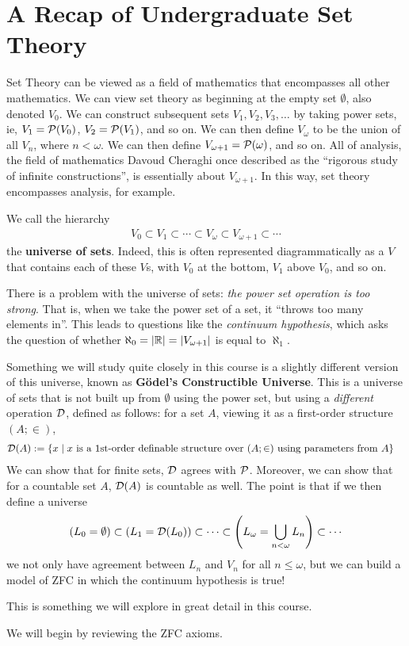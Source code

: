
\chapter{A Recap of Undergraduate Set Theory} \label{Ch1:CH}
\thispagestyle{empty}

Set Theory can be viewed as a field of mathematics that encompasses all other mathematics. We can view set theory as beginning at the empty set $\emptyset$, also denoted $V_0$. We can construct subsequent sets $V_1, V_2, V_3, \ldots$ by taking power sets, ie, $V_1 = \mathcal{P}\!\left( V_0 \right)$, $V_2 = \mathcal{P}\!\left( V_1 \right)$, and so on. We can then define $V_{\omega}$ to be the union of all $V_n$, where $n < \omega$. We can then define $V_{\omega + 1} = \mathcal{P}\!\left( \omega \right)$, and so on. All of analysis, the field of mathematics Davoud Cheraghi once described as the ``rigorous study of infinite constructions'', is essentially about $V_{\omega + 1}$. In this way, set theory encompasses analysis, for example.

We call the hierarchy
\begin{align*}
    V_0 \subset V_1 \subset \cdots \subset V_{\omega} \subset V_{\omega + 1} \subset \cdots
\end{align*}
the \textbf{universe of sets}. Indeed, this is often represented diagrammatically as a $V$ that contains each of these $V$s, with $V_0$ at the bottom, $V_1$ above $V_0$, and so on.

There is a problem with the universe of sets: \textit{the power set operation is too strong}. That is, when we take the power set of a set, it ``throws too many elements in''. This leads to questions like the \textit{continuum hypothesis}, which asks the question of whether $\aleph_0 = \left\lvert \mathbb{R} \right\rvert = \left\lvert V_{\omega + 1} \right\rvert$ is equal to $\aleph_1$.

Something we will study quite closely in this course is a slightly different version of this universe, known as \textbf{Gödel's Constructible Universe}. This is a universe of sets that is not built up from $\emptyset$ using the power set, but using a \textit{different} operation $\mathcal{D}$, defined as follows: for a set $A$, viewing it as a first-order structure $(A; \in)$,
\begin{align*}
    \mathcal{D}(A) &:= \left\{ x \; \middle\vert \; x \text{ is a 1st-order definable structure over } (A; \in) \text{ using parameters from } A \right\}
\end{align*}
We can show that for finite sets, $\mathcal{D}$ agrees with $\mathcal{P}$. Moreover, we can show that for a countable set $A$, $\mathcal{D}(A)$ is countable as well. The point is that if we then define a universe
\begin{align*}
    \left( L_0 = \emptyset \right) \subset \left( L_1 = \mathcal{D}\!\left( L_0 \right) \right) \subset \cdots \subset \left( L_{\omega} = \bigcup_{n < \omega} L_n \right) \subset \cdots
\end{align*}
we not only have agreement between $L_n$ and $V_n$ for all $n \leq \omega$, but we can build a model of ZFC in which the continuum hypothesis is true!

This is something we will explore in great detail in this course.

We will begin by reviewing the ZFC axioms.


